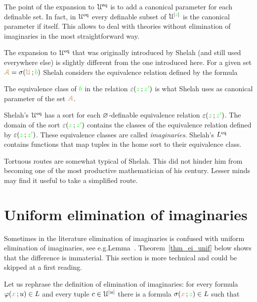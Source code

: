 \documentclass[creche.tex]{subfiles}
\begin{document}
The point of the expansion to $\EuScript U^{{\rm eq}}$ is to add a canonical parameter for each definable set. In fact, in $\EuScript U^{{\rm eq}}$ every definable subset of $\EuScript U^{|{\color{green} z}|}$ is the canonical parameter if itself. This allows to deal with theories without elimination of imaginaries in the most straightforward way.

The expansion to $\EuScript U^{{\rm eq}}$ that was originally introduced by Shelah (and still used everywhere else) is slightly different from the one introduced here. For a given set ${\color{brown}\EuScript A}=\sigma({\color{brown}\EuScript U}\,;{\color{green} b})$ Shelah considers the equivalence relation defined by the formula


The equivalence class of ${\color{green} b}$ in the relation $\varepsilon({\color{green} z}\,;{\color{green} z'})$ is what Shelah uses as canonical parameter of the set ${\color{brown}\EuScript A}$. 

Shelah's $\EuScript U^{{\rm eq}}$ has a sort for each $\varnothing$-definable equivalence relation $\varepsilon({\color{green} z}\,;{\color{green} z'})$. The domain of the sort $\varepsilon({\color{green} z}\,;{\color{green} z'})$ contains the classes of the equivalence relation defined by $\varepsilon({\color{green} z}\,;{\color{green} z'})$. These equivalence classes are called \emph{imaginaries}. Shelah's $L^{{\rm eq}}$ contains functions that map tuples in the home sort to their equivalence class.

Tortuous routes are somewhat typical of Shelah. This did not hinder him from becoming one of the most productive mathematician of his century. Lesser minds may find it useful to take a simplified route.


\section{Uniform elimination of imaginaries}

\def\medrel#1{\parbox[t]{5ex}{$\displaystyle\hfil #1$}}
\def\ceq#1#2#3{\parbox[t]{35ex}{$\displaystyle #1$}\medrel{#2}{$\displaystyle #3$}}

Sometimes in the literature elimination of imaginaries is confused with uniform elimination of imaginaries, see e.g.\@ Lemma~\cite[Defnition 8.4.2]{TZ}. Theorem~\ref{thm_ei_unif} below shows that the difference is immaterial. This section is more technical and could be skipped at a first reading. 

Let us rephrase the definition of elimination of imaginaries: for every formula $\varphi({\color{brown} x}\,;u)\in L$ and every tuple $c\in\EuScript U^{|u|}$ there is a formula $\sigma({\color{brown} x}\,;{\color{green} z})\in L$ such that
\end{document}
